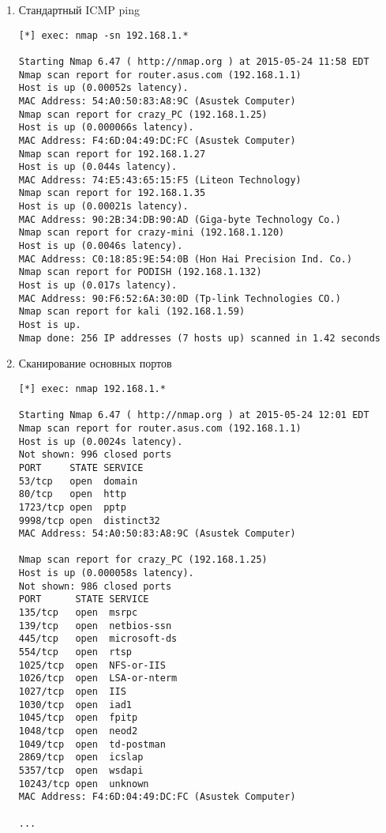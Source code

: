 \documentclass{article}
\begin{document}
\begin{enumerate}
\item Стандартный ICMP ping

\begin{verbatim}
[*] exec: nmap -sn 192.168.1.*

Starting Nmap 6.47 ( http://nmap.org ) at 2015-05-24 11:58 EDT
Nmap scan report for router.asus.com (192.168.1.1)
Host is up (0.00052s latency).
MAC Address: 54:A0:50:83:A8:9C (Asustek Computer)
Nmap scan report for crazy_PC (192.168.1.25)
Host is up (0.000066s latency).
MAC Address: F4:6D:04:49:DC:FC (Asustek Computer)
Nmap scan report for 192.168.1.27
Host is up (0.044s latency).
MAC Address: 74:E5:43:65:15:F5 (Liteon Technology)
Nmap scan report for 192.168.1.35
Host is up (0.00021s latency).
MAC Address: 90:2B:34:DB:90:AD (Giga-byte Technology Co.)
Nmap scan report for crazy-mini (192.168.1.120)
Host is up (0.0046s latency).
MAC Address: C0:18:85:9E:54:0B (Hon Hai Precision Ind. Co.)
Nmap scan report for PODISH (192.168.1.132)
Host is up (0.017s latency).
MAC Address: 90:F6:52:6A:30:0D (Tp-link Technologies CO.)
Nmap scan report for kali (192.168.1.59)
Host is up.
Nmap done: 256 IP addresses (7 hosts up) scanned in 1.42 seconds
\end{verbatim}

\item Сканирование основных портов
\begin{verbatim}
[*] exec: nmap 192.168.1.*

Starting Nmap 6.47 ( http://nmap.org ) at 2015-05-24 12:01 EDT
Nmap scan report for router.asus.com (192.168.1.1)
Host is up (0.0024s latency).
Not shown: 996 closed ports
PORT     STATE SERVICE
53/tcp   open  domain
80/tcp   open  http
1723/tcp open  pptp
9998/tcp open  distinct32
MAC Address: 54:A0:50:83:A8:9C (Asustek Computer)

Nmap scan report for crazy_PC (192.168.1.25)
Host is up (0.000058s latency).
Not shown: 986 closed ports
PORT      STATE SERVICE
135/tcp   open  msrpc
139/tcp   open  netbios-ssn
445/tcp   open  microsoft-ds
554/tcp   open  rtsp
1025/tcp  open  NFS-or-IIS
1026/tcp  open  LSA-or-nterm
1027/tcp  open  IIS
1030/tcp  open  iad1
1045/tcp  open  fpitp
1048/tcp  open  neod2
1049/tcp  open  td-postman
2869/tcp  open  icslap
5357/tcp  open  wsdapi
10243/tcp open  unknown
MAC Address: F4:6D:04:49:DC:FC (Asustek Computer)

...
\end{verbatim}
\end{enumerate}
\end{document}
